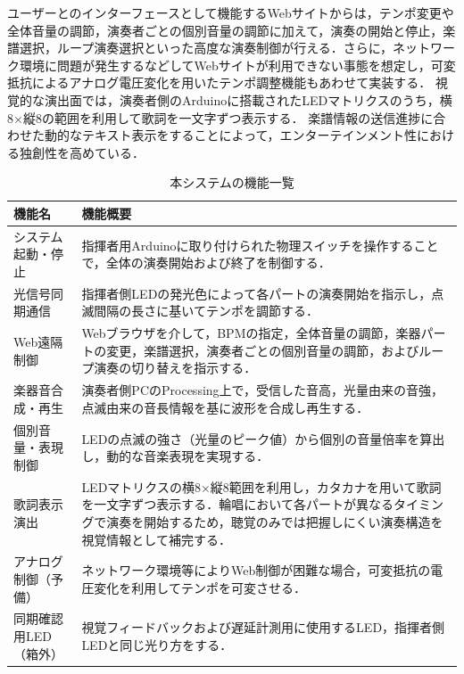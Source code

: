 \documentclass[lualatex,book,openany,paper=a4paper,jafontsize=11.5pt,jafontscale=1.05]{jlreq}
\begin{document}
ユーザーとのインターフェースとして機能するWebサイトからは，テンポ変更や全体音量の調節，演奏者ごとの個別音量の調節に加えて，演奏の開始と停止，楽譜選択，ループ演奏選択といった高度な演奏制御が行える．さらに，ネットワーク環境に問題が発生するなどしてWebサイトが利用できない事態を想定し，可変抵抗によるアナログ電圧変化を用いたテンポ調整機能もあわせて実装する．
視覚的な演出面では，演奏者側のArduinoに搭載されたLEDマトリクスのうち，横8$\times$縦8の範囲を利用して歌詞を一文字ずつ表示する．
楽譜情報の送信進捗に合わせた動的なテキスト表示をすることによって，エンターテインメント性における独創性を高めている．
\begin{table}[H]
\centering
\caption{本システムの機能一覧}
\label{機能一覧}
\begin{tabular}{|p{3.5cm}|p{9.5cm}|}
\hline
\textbf{機能名} & \textbf{機能概要} \\ \hline
システム起動・停止 & 指揮者用Arduinoに取り付けられた物理スイッチを操作することで，全体の演奏開始および終了を制御する． \\ \hline
光信号同期通信 & 指揮者側LEDの発光色によって各パートの演奏開始を指示し，点滅間隔の長さに基いてテンポを調節する． \\ \hline
Web遠隔制御 & Webブラウザを介して，BPMの指定，全体音量の調節，楽器パートの変更，楽譜選択，演奏者ごとの個別音量の調節，およびループ演奏の切り替えを指示する． \\ \hline
楽器音合成・再生 & 演奏者側PCのProcessing上で，受信した音高，光量由来の音強，点滅由来の音長情報を基に波形を合成し再生する． \\ \hline
個別音量・表現制御 & LEDの点滅の強さ（光量のピーク値）から個別の音量倍率を算出し，動的な音楽表現を実現する． \\ \hline
歌詞表示演出 & LEDマトリクスの横8$\times$縦8範囲を利用し，カタカナを用いて歌詞を一文字ずつ表示する．輪唱において各パートが異なるタイミングで演奏を開始するため，聴覚のみでは把握しにくい演奏構造を視覚情報として補完する． \\ \hline
アナログ制御（予備） & ネットワーク環境等によりWeb制御が困難な場合，可変抵抗の電圧変化を利用してテンポを可変させる． \\ \hline
同期確認用LED（箱外） & 視覚フィードバックおよび遅延計測用に使用するLED，指揮者側LEDと同じ光り方をする． \\ \hline
\end{tabular}
\end{table}

\end{document}

